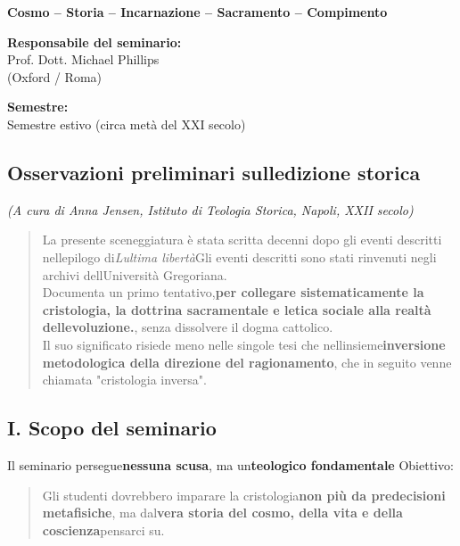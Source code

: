 \documentclass[
]{article}
\begin{document}
\textbf{Cosmo -- Storia -- Incarnazione -- Sacramento -- Compimento}

\textbf{Responsabile del seminario:\\
}Prof. Dott. Michael Phillips\\
(Oxford / Roma)

\textbf{Semestre:\\
}Semestre estivo (circa metà del XXI secolo)

\subsection{\texorpdfstring{\textbf{Osservazioni preliminari sull\textquotesingle edizione storica}}{Osservazioni preliminari sull\textquotesingle edizione storica}}\label{osservazioni-preliminari-sulledizione-storica}

\emph{(A cura di Anna Jensen, Istituto di Teologia Storica, Napoli, XXII secolo)}

\begin{quote}
La presente sceneggiatura è stata scritta decenni dopo gli eventi descritti nell\textquotesingle epilogo di\emph{L\textquotesingle ultima libertà}Gli eventi descritti sono stati rinvenuti negli archivi dell\textquotesingle Università Gregoriana.\\
Documenta un primo tentativo,\textbf{per collegare sistematicamente la cristologia, la dottrina sacramentale e l\textquotesingle etica sociale alla realtà dell\textquotesingle evoluzione.}, senza dissolvere il dogma cattolico.\\
Il suo significato risiede meno nelle singole tesi che nell\textquotesingle insieme\textbf{inversione metodologica della direzione del ragionamento}, che in seguito venne chiamata "cristologia inversa".
\end{quote}

\subsection{\texorpdfstring{\textbf{I. Scopo del seminario}}{I. Scopo del seminario}}\label{i.-scopo-del-seminario}

Il seminario persegue\textbf{nessuna scusa}, ma un\textbf{teologico fondamentale} Obiettivo:

\begin{quote}
Gli studenti dovrebbero imparare la cristologia\textbf{non più da predecisioni metafisiche}, ma dal\textbf{vera storia del cosmo, della vita e della coscienza}pensarci su.
\end{quote}
\end{document}
